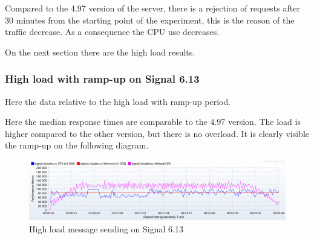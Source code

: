 Compared to the 4.97 version of the server, there is a rejection of requests after $30$ minutes from the starting point of the experiment, this is the reason of the traffic decrease.
As a consequence the CPU use decreases.

On the next section there are the high load results.

\subsubsection{High load with ramp-up on Signal 6.13}

Here the data relative to the high load with ramp-up period.

\begin{table}[H]
\caption{High load message sending on Signal 6.13}
\label{tab:highloadmessagenew}
\end{table}

Here the median response times are comparable to the 4.97 version.
The load is higher compared to the other version, but there is no overload.
It is clearly visible the ramp-up on the following diagram.

\begin{figure}[H]
    \centering
    \includegraphics[width=\textwidth]{images/613/signal-message-load}
    \caption{High load message sending on Signal 6.13}
    \label{fig:signalhighmessageloadnew}
\end{figure}

